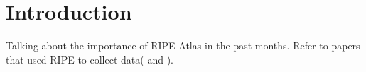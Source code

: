 \section{Introduction}

Talking about the importance of RIPE Atlas in the past months. Refer to papers that used RIPE to collect data(\cite{lutu2014understanding} and \cite{brownlee2014searching}).
